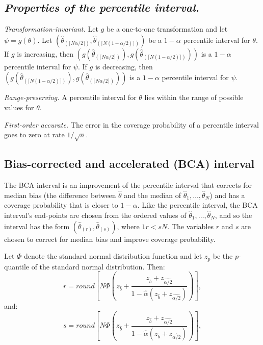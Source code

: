 \begin{labwork}
\subsection{{\it Properties of the percentile interval.}}
\work
\begin{asparaenum}[(a)]
\item {\it Transformation-invariant.} Let $g$ be a one-to-one transformation and let $\psi=g(\theta)$. Let $(\hat{\theta}_{(\lceil N\alpha/2\rceil)},\hat{\theta}_{(\lceil N(1-\alpha/2)\rceil)})$ be a $1-\alpha$ percentile interval for $\theta$. If $g$ is increasing, then $(g(\hat{\theta}_{(\lceil N\alpha/2\rceil)}),g(\hat{\theta}_{(\lceil N(1-\alpha/2)\rceil)}))$ is a $1-\alpha$ percentile interval for $\psi$. If $g$ is decreasing, then $(g(\hat{\theta}_{(\lceil N(1-\alpha/2)\rceil)}),g(\hat{\theta}_{(\lceil N\alpha/2\rceil)}))$ is a $1-\alpha$ percentile interval for $\psi$.

\item {\it Range-preserving.} A percentile interval for $\theta$ lies within the range of possible values for $\theta$.

\item {\it First-order accurate.} The error in the coverage probability of a percentile interval goes to zero at rate $1/\sqrt{n}$.

\end{asparaenum}
\end{labwork}

\subsection{Bias-corrected and accelerated (BCA) interval} 
\work
The BCA interval is an improvement of the percentile interval that corrects for median bias (the difference between $\hat{\theta}$ and the median of $\hat{\theta}_1,\ldots,\hat{\theta}_N$) and has a coverage probability that is closer to $1-\alpha$. Like the percentile interval, the BCA interval's end-points are chosen from the ordered values of $\hat{\theta}_1,\ldots,\hat{\theta}_N$, and so the interval has the form $(\hat{\theta}_{(r)},\hat{\theta}_{(s)})$, where $1   r < s   N$. The variables $r$ and $s$ are chosen to correct for median bias and improve coverage probability.

Let $\Phi$ denote the standard normal distribution function and let $z_p$ be the $p$-quantile of the standard normal distribution. Then:
\begin{equation}
r=round[N\Phi(z_{\hat{b}}+\frac{z_{\hat{b}}+z_{\hat{\alpha/2}}}{1-\hat{\alpha}(z_{\hat{b}}+z_{\hat{\alpha/2}})})],
\end{equation}
and:
\begin{equation}
s=round[N\Phi(z_{\hat{b}}+\frac{z_{\hat{b}}+z_{\hat{\alpha/2}}}{1-\hat{\alpha}(z_{\hat{b}}+z_{\hat{\alpha/2}})})],
\end{equation}

